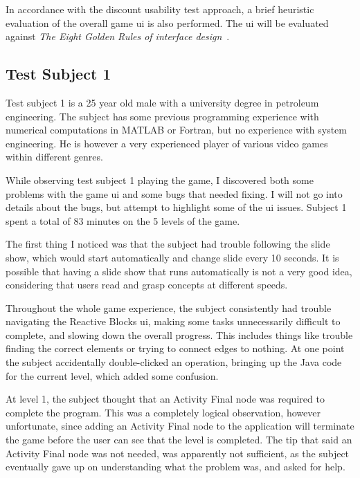 \noindent
In accordance with the discount usability test approach, a brief heuristic evaluation of the overall game \gls{ui} is also performed. The \gls{ui} will be evaluated against \emph{The Eight Golden Rules of interface design}~\cite{shneiderman:user_interface}.

\subsection{Test Subject 1}
\label{sec:game_testing_subject1}
Test subject 1 is a 25 year old male with a university degree in petroleum engineering. The subject has some previous programming experience with numerical computations in MATLAB or Fortran, but no experience with system engineering. He is however a very experienced player of various video games within different genres.

\noindent
While observing test subject 1 playing the game, I discovered both some problems with the game \gls{ui} and some bugs that needed fixing. I will not go into details about the bugs, but attempt to highlight some of the \gls{ui} issues. Subject 1 spent a total of 83 minutes on the 5 levels of the game.

\noindent
The first thing I noticed was that the subject had trouble following the slide show, which would start automatically and change slide every 10 seconds. It is possible that having a slide show that runs automatically is not a very good idea, considering that users read and grasp concepts at different speeds.

\noindent
Throughout the whole game experience, the subject consistently had trouble navigating the Reactive Blocks \gls{ui}, making some tasks unnecessarily difficult to complete, and slowing down the overall progress. This includes things like trouble finding the correct elements or trying to connect edges to nothing. At one point the subject accidentally double-clicked an operation, bringing up the Java code for the current level, which added some confusion.

\noindent
At level 1, the subject thought that an Activity Final node was required to complete the program. This was a completely logical observation, however unfortunate, since adding an Activity Final node to the application will terminate the game before the user can see that the level is completed. The tip that said an Activity Final node was not needed, was apparently not sufficient, as the subject eventually gave up on understanding what the problem was, and asked for help.

